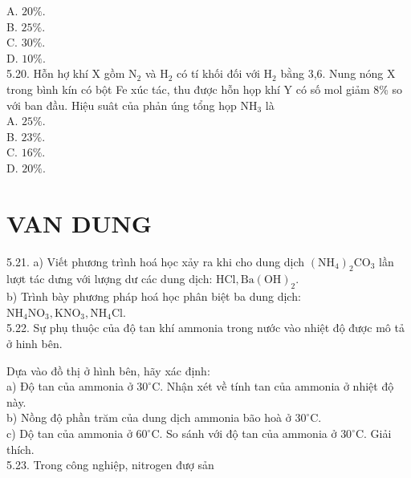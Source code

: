\documentclass[10pt]{article}
\begin{document}
A. $20 \%$.\\
B. $25 \%$.\\
C. $30 \%$.\\
D. $10 \%$.\\
5.20. Hỗn hợ khí X gồm $\mathrm{N}_{2}$ và $\mathrm{H}_{2}$ có tí khối đối với $\mathrm{H}_{2}$ bằng 3,6. Nung nóng X trong bình kín có bột Fe xúc tác, thu được hỗn họp khí Y có số mol giảm 8\% so với ban đầu. Hiệu suât của phản úng tổng họp $\mathrm{NH}_{3}$ là\\
A. $25 \%$.\\
B. $23 \%$.\\
C. $16 \%$.\\
D. $20 \%$.

\section*{VAN DUNG}
5.21. a) Viết phương trình hoá học xảy ra khi cho dung dịch $\left(\mathrm{NH}_{4}\right)_{2} \mathrm{CO}_{3}$ lần lượt tác dưng với lượng dư các dung dịch: $\mathrm{HCl}, \mathrm{Ba}(\mathrm{OH})_{2}$.\\
b) Trình bày phương pháp hoá học phân biệt ba dung dịch: $\mathrm{NH}_{4} \mathrm{NO}_{3}, \mathrm{KNO}_{3}, \mathrm{NH}_{4} \mathrm{Cl}$.\\
5.22. Sự phụ thuộc của độ tan khí ammonia trong nước vào nhiệt độ được mô tả ở hinh bên.

Dựa vào đồ thị ở hình bên, hãy xác định:\\
a) Độ tan của ammonia ở $30^{\circ} \mathrm{C}$. Nhận xét về tính tan của ammonia ở nhiệt độ này.\\
b) Nồng độ phần trăm của dung dịch ammonia bão hoà ở $30^{\circ} \mathrm{C}$.\\
c) Dộ tan của ammonia ở $60^{\circ} \mathrm{C}$. So sánh với độ tan của ammonia ở $30^{\circ} \mathrm{C}$. Giải thích.\\
5.23. Trong công nghiệp, nitrogen đượ sản
\end{document}
